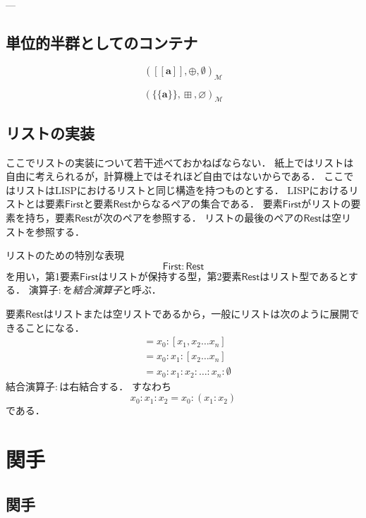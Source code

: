 \documentclass[twocolumn]{jsbook}
\def\[{[\![}
\def\]{]\!]}
\newcommand{\hsklType}[1]{\textbf{#1}}
\DeclareMathOperator{\hsklMaybeAppend}{\boxplus}
\newcommand{\hsklAppend}{\oplus}
\newcommand{\hsklEmptyList}{\emptyset}
\newcommand{\hsklNothing}{\varnothing}
\newcommand{\hsklListType}[1]{\[#1\]}
\newcommand{\hsklMaybeType}[1]{\{\!\{#1\}\!\}}
\newcommand{\mathVarKeyword}[1]{\mathsf{#1}}
\newcommand{\mathFirst}{\mathVarKeyword{First}}
\newcommand{\mathRest}{\mathVarKeyword{Rest}}
\newcommand{\mathMonoid}[3]{(#1,#2,#3)_\mathcal{M}}
\newcommand{\keyword}[1]{\emph{#1}}
\newcommand{\typename}[1]{\mathbf{#1}}
\newcommand{\typeconstructor}[2]{\mathop{#1}\,#2}
\newcommand{\typemaybe}{\typename{Maybe}}
\newcommand{\constantnothing}{\varnothing}
\newcommand{\binarymaybeappend}{\boxplus}
\newcommand{\rangedots}{\dots}
\begin{document}

---

\section{単位的半群としてのコンテナ}

$$\mathMonoid{\hsklListType{\hsklType{a}}}{\hsklAppend}{\hsklEmptyList}$$

$$\mathMonoid{\hsklMaybeType{\hsklType{a}}}{\hsklMaybeAppend}{\hsklNothing}$$



\section{リストの実装}

ここでリストの実装について若干述べておかねばならない．
紙上ではリストは自由に考えられるが，計算機上ではそれほど自由ではないからである．
ここではリストはLISPにおけるリストと同じ構造を持つものとする．
LISPにおけるリストとは要素$\mathFirst$と要素$\mathRest$からなるペアの集合である．
要素$\mathFirst$がリストの要素を持ち，要素$\mathRest$が次のペアを参照する．
リストの最後のペアの$\mathRest$は空リストを参照する．

リストのための特別な表現$$\mathFirst:\mathRest$$を用い，第1要素$\mathFirst$はリストが保持する型，第2要素$\mathRest$はリスト型であるとする．
演算子$:$を\keyword{結合演算子}と呼ぶ．

要素$\mathRest$はリストまたは空リストであるから，一般にリストは次のように展開できることになる．
\begin{align*}
[x_0,x_1,x_2\rangedots x_n]&=x_0:[x_1,x_2\rangedots x_n]\\
&=x_0:x_1:[x_2\rangedots x_n]\\
&=x_0:x_1:x_2:\dots:x_n:\hsklEmptyList
\end{align*}
結合演算子$:$は右結合する．
すなわち$$x_0:x_1:x_2=x_0:(x_1:x_2)$$である．


\chapter{関手}

\section{関手}
\end{document}
